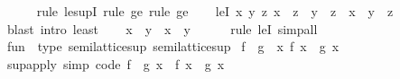 \begin{isabellebody}
\ \ \ \ \isamarkupfalse%
\ {\isacharparenleft}{\kern0pt}rule\ le{\isacharunderscore}{\kern0pt}supI{\isacharparenright}{\kern0pt}\ {\isacharparenleft}{\kern0pt}rule\ ge{}{\isacharcomma}{\kern0pt}\ rule\ ge{}{\isacharparenright}{\kern0pt}\isanewline
\ \ \isamarkupfalse%
\ leI{\isacharcolon}{\kern0pt}\ {\isachardoublequoteopen}{\isasymAnd}x\ y\ z{\isachardot}{\kern0pt}\ x\ {\isasymle}\ z\ {\isasymLongrightarrow}\ y\ {\isasymle}\ z\ {\isasymLongrightarrow}\ x\ {\isasymnabla}\ y\ {\isasymle}\ z{\isachardoublequoteclose}\isanewline
\ \ \ \ \isamarkupfalse%
\ {\isacharparenleft}{\kern0pt}blast\ intro{\isacharcolon}{\kern0pt}\ least{\isacharparenright}{\kern0pt}\isanewline
\ \ \isamarkupfalse%
\ {\isachardoublequoteopen}x\ {\isasymnabla}\ y\ {\isasymle}\ x\ {\isasymsqunion}\ y{\isachardoublequoteclose}\isanewline
\ \ \ \ \isamarkupfalse%
\ {\isacharparenleft}{\kern0pt}rule\ leI{\isacharparenright}{\kern0pt}\ simp{\isacharunderscore}{\kern0pt}all\isanewline
{}\isamarkupfalse%
%
\endisatagproof
{\isafoldproof}%
%
\isadelimproof
%
\endisadelimproof
%
\isadelimdocument
%
\endisadelimdocument
%
\isatagdocument
%
\isamarkuptrue%
%
\endisatagdocument
{\isafolddocument}%
%
\isadelimdocument
%
\endisadelimdocument
{}\isamarkupfalse%
\ {\isachardoublequoteopen}fun{\isachardoublequoteclose}\ {\isacharcolon}{\kern0pt}{\isacharcolon}{\kern0pt}\ {\isacharparenleft}{\kern0pt}type{\isacharcomma}{\kern0pt}\ semilattice{\isacharunderscore}{\kern0pt}sup{\isacharparenright}{\kern0pt}\ semilattice{\isacharunderscore}{\kern0pt}sup\isanewline
{}\isanewline
\isanewline
{}\isamarkupfalse%
\ {\isachardoublequoteopen}f\ {\isasymsqunion}\ g\ {\isacharequal}{\kern0pt}\ {\isacharparenleft}{\kern0pt}{\isasymlambda}x{\isachardot}{\kern0pt}\ f\ x\ {\isasymsqunion}\ g\ x{\isacharparenright}{\kern0pt}{\isachardoublequoteclose}\isanewline
\isanewline
{}\isamarkupfalse%
\ sup{\isacharunderscore}{\kern0pt}apply\ {\isacharbrackleft}{\kern0pt}simp{\isacharcomma}{\kern0pt}\ code{\isacharbrackright}{\kern0pt}{\isacharcolon}{\kern0pt}\ {\isachardoublequoteopen}{\isacharparenleft}{\kern0pt}f\ {\isasymsqunion}\ g{\isacharparenright}{\kern0pt}\ x\ {\isacharequal}{\kern0pt}\ f\ x\ {\isasymsqunion}\ g\ x{\isachardoublequoteclose}\isanewline
%
\isadelimproof
\ \ %
\endisadelimproof
%
\isatagproof

\end{isabellebody}
